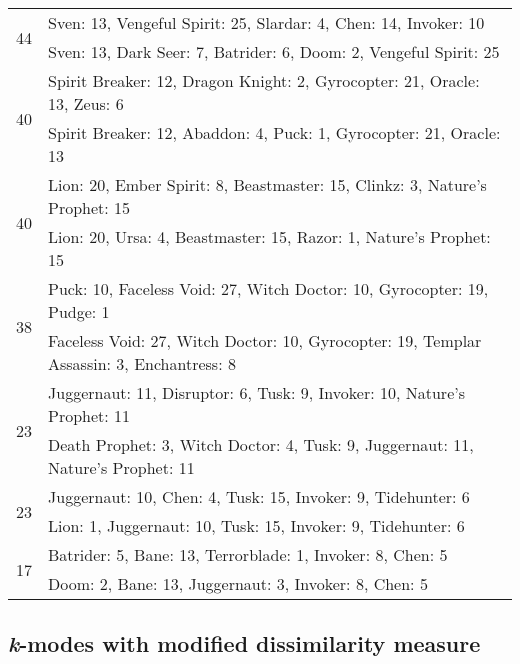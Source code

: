 \documentclass[result.tex]{subfiles}
\begin{document}
\begin{table}[H]
\begin{tabular}{ | c | p{12.5cm} | }
    \hline
    \multirow{2}{*}{44}
    & Sven: 13, Vengeful Spirit: 25, Slardar: 4, Chen: 14, Invoker: 10 \\
    & Sven: 13, Dark Seer: 7, Batrider: 6, Doom: 2, Vengeful Spirit: 25 \\
    \hline
    \multirow{2}{*}{40}
    & Spirit Breaker: 12, Dragon Knight: 2, Gyrocopter: 21, Oracle: 13, Zeus: 6 \\
    & Spirit Breaker: 12, Abaddon: 4, Puck: 1, Gyrocopter: 21, Oracle: 13 \\
    \hline
    \multirow{2}{*}{40}
    & Lion: 20, Ember Spirit: 8, Beastmaster: 15, Clinkz: 3, Nature's Prophet: 15 \\
    & Lion: 20, Ursa: 4, Beastmaster: 15, Razor: 1, Nature's Prophet: 15 \\
    \hline
    \multirow{2}{*}{38}
    & Puck: 10, Faceless Void: 27, Witch Doctor: 10, Gyrocopter: 19, Pudge: 1 \\
    & Faceless Void: 27, Witch Doctor: 10, Gyrocopter: 19, Templar Assassin: 3, Enchantress: 8 \\
    \hline
    \multirow{2}{*}{23}
    & Juggernaut: 11, Disruptor: 6, Tusk: 9, Invoker: 10, Nature's Prophet: 11 \\
    & Death Prophet: 3, Witch Doctor: 4, Tusk: 9, Juggernaut: 11, Nature's Prophet: 11 \\
    \hline
    \multirow{2}{*}{23}
    & Juggernaut: 10, Chen: 4, Tusk: 15, Invoker: 9, Tidehunter: 6 \\
    & Lion: 1, Juggernaut: 10, Tusk: 15, Invoker: 9, Tidehunter: 6 \\
    \hline
    \multirow{2}{*}{17}
    & Batrider: 5, Bane: 13, Terrorblade: 1, Invoker: 8, Chen: 5 \\
    & Doom: 2, Bane: 13, Juggernaut: 3, Invoker: 8, Chen: 5 \\
    \hline
  \end{tabular}
  \caption{}
  \label{}
\end{table}

\newpage

\subsection*{\textit{k}-modes with modified dissimilarity measure}
\end{document}
